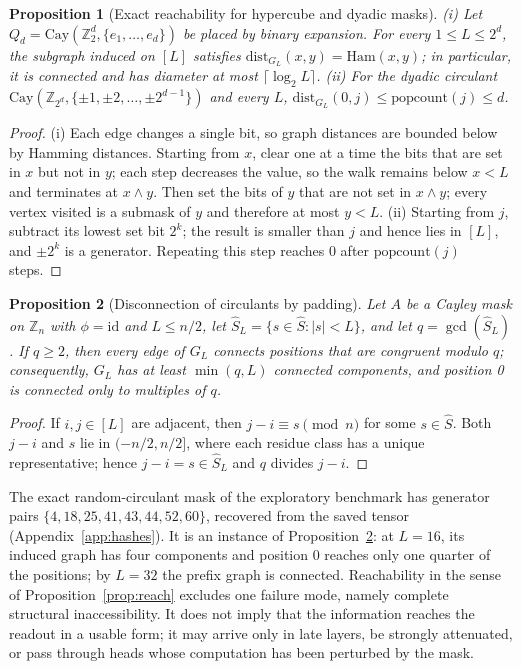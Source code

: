 \documentclass[10pt]{article}
\newtheorem{proposition}{Proposition}
\newcommand{\Z}{\mathbb{Z}}
\newcommand{\Cay}{\mathrm{Cay}}
\begin{document}
\begin{proposition}[Exact reachability for hypercube and dyadic masks]
\label{prop:hypercube}
(i) Let $Q_d=\Cay(\Z_2^d,\{e_1,\dots,e_d\})$ be placed by binary expansion. For every $1\le L\le2^d$, the subgraph induced on $[L]$ satisfies $\mathrm{dist}_{G_L}(x,y)=\mathrm{Ham}(x,y)$; in particular, it is connected and has diameter at most $\lceil\log_2L\rceil$. (ii) For the dyadic circulant $\Cay(\Z_{2^d},\{\pm1,\pm2,\dots,\pm2^{d-1}\})$ and every $L$, $\mathrm{dist}_{G_L}(0,j)\le\mathrm{popcount}(j)\le d$.
\end{proposition}
\begin{proof}
(i) Each edge changes a single bit, so graph distances are bounded below by Hamming distances. Starting from $x$, clear one at a time the bits that are set in $x$ but not in $y$; each step decreases the value, so the walk remains below $x<L$ and terminates at $x\wedge y$. Then set the bits of $y$ that are not set in $x\wedge y$; every vertex visited is a submask of $y$ and therefore at most $y<L$. (ii) Starting from $j$, subtract its lowest set bit $2^k$; the result is smaller than $j$ and hence lies in $[L]$, and $\pm2^k$ is a generator. Repeating this step reaches $0$ after $\mathrm{popcount}(j)$ steps.
\end{proof}

\begin{proposition}[Disconnection of circulants by padding]
\label{prop:disconnect}
Let $A$ be a Cayley mask on $\Z_n$ with $\phi=\mathrm{id}$ and $L\le n/2$, let $\hat S_L=\{s\in\hat S:|s|<L\}$, and let $q=\gcd(\hat S_L)$. If $q\ge2$, then every edge of $G_L$ connects positions that are congruent modulo $q$; consequently, $G_L$ has at least $\min(q,L)$ connected components, and position 0 is connected only to multiples of $q$.
\end{proposition}
\begin{proof}
If $i,j\in[L]$ are adjacent, then $j-i\equiv s\pmod n$ for some $s\in\hat S$. Both $j-i$ and $s$ lie in $(-n/2,n/2]$, where each residue class has a unique representative; hence $j-i=s\in\hat S_L$ and $q$ divides $j-i$.
\end{proof}

The exact random-circulant mask of the exploratory benchmark has generator pairs $\{4,18,25,41,43,44,52,60\}$, recovered from the saved tensor (Appendix~\ref{app:hashes}). It is an instance of Proposition~\ref{prop:disconnect}: at $L=16$, its induced graph has four components and position 0 reaches only one quarter of the positions; by $L=32$ the prefix graph is connected. Reachability in the sense of Proposition~\ref{prop:reach} excludes one failure mode, namely complete structural inaccessibility. It does not imply that the information reaches the readout in a usable form; it may arrive only in late layers, be strongly attenuated, or pass through heads whose computation has been perturbed by the mask.
\end{document}
